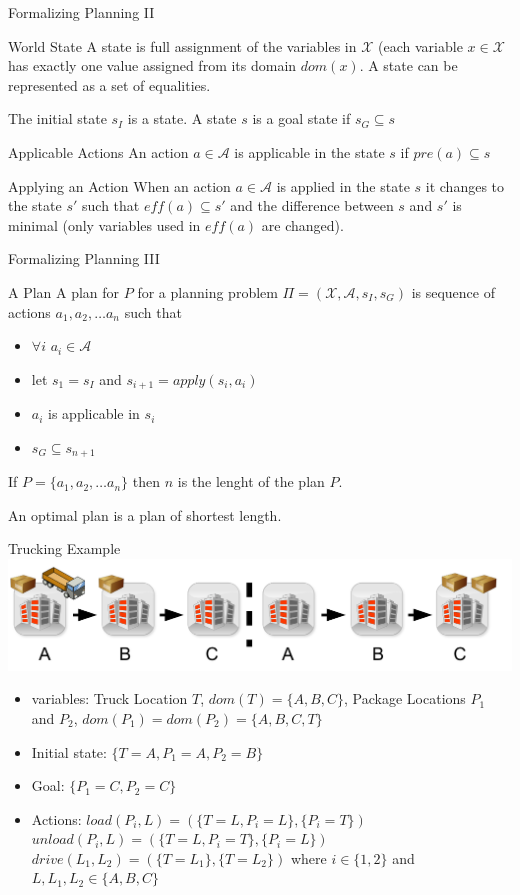 \documentclass[t]{sdqbeamer}
\begin{document}
\begin{frame}{Formalizing Planning II}
\begin{block}{World State}
A state is full assignment of the variables in $\mathcal{X}$ (each variable $x \in \mathcal{X}$
has exactly one value assigned from its domain $dom(x)$. A state can be represented as a set of equalities.
\end{block}
The initial state $s_I$ is a state. A state $s$ is a goal state if $s_G \subseteq s$
\begin{block}{Applicable Actions}
An action $a\in\mathcal{A}$ is applicable in the state $s$ if $pre(a) \subseteq s$
\end{block}
\begin{block}{Applying an Action}
When an action $a\in\mathcal{A}$ is applied in the state $s$ it changes to the state $s'$
such that $eff(a)\subseteq s'$ and the difference between $s$ and $s'$ is minimal
(only variables used in $eff(a)$ are changed).
\end{block}
\end{frame}


\begin{frame}{Formalizing Planning III}
\begin{block}{A Plan}
A plan for $P$ for a planning problem $\Pi = (\mathcal{X}, \mathcal{A}, s_I, s_G)$ is sequence of
actions $a_1, a_2, \dots a_n$ such that
\begin{itemize}
	\item $\forall i$ $a_i \in \mathcal{A}$
	\item let $s_1 = s_I$ and $s_{i+1} = apply(s_i,a_i)$
	\item $a_i$ is applicable in $s_i$
	\item $s_G \subseteq s_{n+1}$
\end{itemize}
If $P=\{a_1, a_2, \dots a_n\}$ then $n$ is the lenght of the plan $P$.
\end{block}
An optimal plan is a plan of shortest length.
\end{frame}

\begin{frame}{Trucking Example}
\includegraphics[scale=0.65]{figures/l10/plan-example.pdf}
\begin{itemize}
	\item variables: Truck Location $T$, $dom(T)=\{A,B,C\}$, Package Locations $P_1$ and $P_2$,
	$dom(P_1)=dom(P_2)=\{A,B,C,T\}$
	\item Initial state: $\{T=A, P_1=A, P_2=B\}$
	\item Goal: $\{P_1=C, P_2=C\}$
	\item Actions: $load(P_i,L) = (\{T=L, P_i=L\}, \{P_i=T\})$
	$unload(P_i,L) = (\{T=L, P_i=T\}, \{P_i=L\})$
	$drive(L_1,L_2) = (\{T=L_1\},\{T=L_2\})$ where $i\in\{1,2\}$ and $L,L_1,L_2\in \{A,B,C\}$
\end{itemize}
\end{frame}
\end{document}
